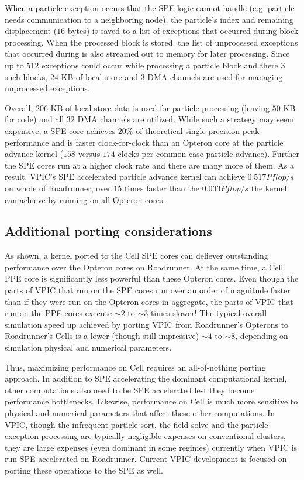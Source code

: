 \documentclass[10pt]{article}
\begin{document}
When a particle exception occurs that the SPE logic cannot handle
(e.g. particle needs communication to a neighboring node), the
particle's index and remaining displacement ($16$ bytes) is saved to a
list of exceptions that occurred during block processing.  When the
processed block is stored, the list of unprocessed exceptions that
occurred during is also streamed out to memory for later processing.
Since up to $512$ exceptions could occur while processing a particle
block and there $3$ such blocks, $24$ KB of local store and $3$ DMA
channels are used for managing unprocessed exceptions.

Overall, $206$ KB of local store data is used for particle processing
(leaving $50$ KB for code) and all $32$ DMA channels are utilized.
While such a strategy may seem expensive, a SPE core achieves $20\%$
of theoretical single precision peak performance and is faster
clock-for-clock than an Opteron core at the particle advance kernel
($158$ versus $174$ clocks per common case particle advance).  Further
the SPE cores run at a higher clock rate and there are many more of
them.  As a result, VPIC's SPE accelerated particle advance kernel can
achieve $0.517 Pflop/s$ on whole of Roadrunner, over $15$ times faster
than the $0.033 Pflop/s$ the kernel can achieve by running on all
Opteron cores.

\subsection{Additional porting considerations}

As shown, a kernel ported to the Cell SPE cores can deliever
outstanding performance over the Opteron cores on Roadrunner.  At the
same time, a Cell PPE core is significantly less powerful than these
Opteron cores.  Even though the parts of VPIC that run on the SPE
cores run over an order of magnitude faster than if they were run on
the Opteron cores in aggregate, the parts of VPIC that run on the PPE
cores execute $\sim 2$ to $\sim 3$ times slower!  The typical overall
simulation speed up achieved by porting VPIC from Roadrunner's
Opterons to Roadrunner's Cells is a lower (though still impressive)
$\sim 4$ to $\sim 8$, depending on simulation physical and numerical
parameters.

Thus, maximizing performance on Cell requires an all-of-nothing
porting approach.  In addition to SPE accelerating the dominant
computational kernel, other computations also need to be SPE
accelerated lest they become performance bottlenecks.  Likewise,
performance on Cell is much more sensitive to physical and numerical
parameters that affect these other computations.  In VPIC, though the
infrequent particle sort, the field solve and the particle exception
processing are typically negligible expenses on conventional clusters,
they are large expenses (even dominant in some regimes) currently when
VPIC is run SPE accelerated on Roadrunner.  Current VPIC development
is focused on porting these operations to the SPE as well.
\end{document}
